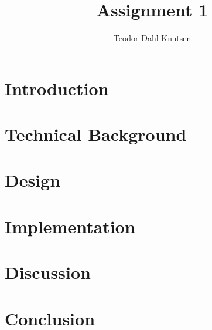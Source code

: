 \documentclass[defaultpackages,inf2200]{simplereport}
\author{Teodor Dahl Knutsen}
\title{Assignment 1}
\begin{document}
\maketitle

\section{Introduction}

\lipsum[1-1]

\section{Technical Background}

\lipsum[2-3]%

\section{Design}

\lipsum[4-5]

\section{Implementation}

\lipsum[6-7]

\section{Discussion}

\lipsum[8-11]

\section{Conclusion}

\lipsum[12-12]
\end{document}
